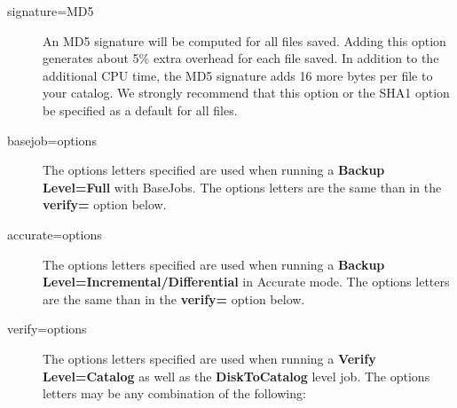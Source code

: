 \begin{description}
\item [signature=MD5]
   An MD5 signature will be computed for all files saved.  Adding this
   option generates about 5\% extra overhead for each file saved.  In
   addition to the additional CPU time, the MD5 signature adds 16 more
   bytes per file to your catalog.  We strongly recommend that this option
   or the SHA1 option be specified as a default for all files.


\item[basejob=\lt{}options\gt{}] 

The options letters specified are used when running a {\bf Backup Level=Full}
with BaseJobs. The options letters are the same than in the \textbf{verify=}
option below.

\item[accurate=\lt{}options\gt{}] 
   The options letters specified are used  when running a {\bf Backup
   Level=Incremental/Differential} in Accurate mode. The options
   letters are the same than in the \textbf{verify=} option below.  

\item [verify=\lt{}options\gt{}]
   The options letters specified are used  when running a {\bf Verify
   Level=Catalog} as well as the  {\bf DiskToCatalog} level job. The options
   letters may be any  combination of the following:  

\end{description}
